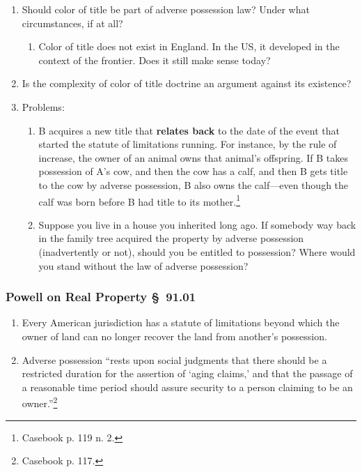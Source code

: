 \begin{enumerate}
\begin{enumerate}
\begin{enumerate}
\begin{enumerate}
            \end{enumerate}
        \end{enumerate}
        \item Should color of title be part of adverse possession law? Under 
        what circumstances, if at all?
        \begin{enumerate}
            \item Color of title does not exist in England. In the US, it 
            developed in the context of the frontier. Does it still make sense 
            today?
        \end{enumerate}
        \item Is the complexity of color of title doctrine an argument against 
        its existence?
        \item Problems:
        \begin{enumerate}
            \item B acquires a new title that \textbf{relates back} to the date of 
            the event that started the statute of limitations running. For 
            instance, by the rule of increase, the owner of an animal owns that 
            animal's offspring.  If B takes possession of A's cow, and then the 
            cow has a calf, and then B  gets title to the cow by adverse 
            possession, B also owns the calf---even though the calf was born 
            before B had title to its mother.\footnote{Casebook p. 119 n. 2.}
            \item Suppose you live in a house you inherited long ago. If somebody 
            way back in the family tree acquired the property by adverse 
            possession (inadvertently or not), should you be entitled to 
            possession? Where would you stand without the law of adverse 
            possession?
        \end{enumerate}
    \end{enumerate}
\end{enumerate}

\subsubsection{Powell on Real Property \S\ 91.01}

\begin{enumerate}
    \item Every American jurisdiction has a statute of limitations beyond 
    which the owner of land can no longer recover the land from another's 
    possession.
    \item Adverse possession ``rests upon social judgments that there should 
    be a restricted duration for the assertion of `aging claims,' and that the 
    passage of a reasonable time period should assure security to a person 
    claiming to be an owner.''\footnote{Casebook p. 117.}
\end{enumerate}

